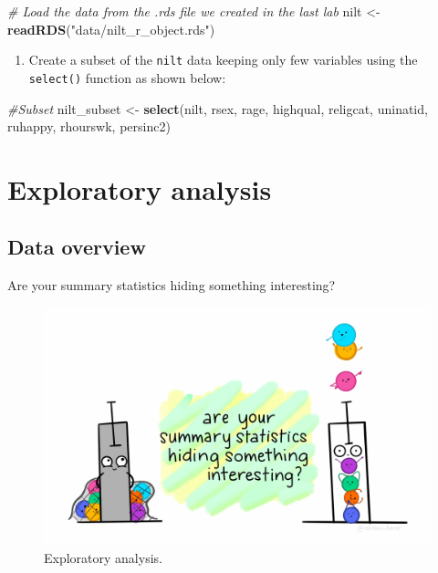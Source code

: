 \documentclass[
]{book}
\newenvironment{Shaded}{\begin{snugshade}}{\end{snugshade}}
\newcommand{\CommentTok}[1]{\textcolor[rgb]{0.56,0.35,0.01}{\textit{#1}}}
\newcommand{\FunctionTok}[1]{\textcolor[rgb]{0.13,0.29,0.53}{\textbf{#1}}}
\newcommand{\NormalTok}[1]{#1}
\newcommand{\OtherTok}[1]{\textcolor[rgb]{0.56,0.35,0.01}{#1}}
\newcommand{\StringTok}[1]{\textcolor[rgb]{0.31,0.60,0.02}{#1}}
\providecommand{\tightlist}{%
  \setlength{\itemsep}{0pt}\setlength{\parskip}{0pt}}
\begin{document}
\begin{Shaded}
\begin{Highlighting}[]
\CommentTok{\# Load the data from the .rds file we created in the last lab}
\NormalTok{nilt }\OtherTok{\textless{}{-}} \FunctionTok{readRDS}\NormalTok{(}\StringTok{"data/nilt\_r\_object.rds"}\NormalTok{)}
\end{Highlighting}
\end{Shaded}

\begin{enumerate}
\def\labelenumi{\arabic{enumi}.}
\setcounter{enumi}{4}
\tightlist
\item
  Create a subset of the \texttt{nilt} data keeping only few variables using the \texttt{select()} function as shown below:
\end{enumerate}

\begin{Shaded}
\begin{Highlighting}[]
\CommentTok{\#Subset}
\NormalTok{nilt\_subset }\OtherTok{\textless{}{-}} \FunctionTok{select}\NormalTok{(nilt, rsex, rage, highqual, religcat, uninatid,  ruhappy, rhourswk, persinc2)}
\end{Highlighting}
\end{Shaded}

\hypertarget{exploratory-analysis}{%
\section{Exploratory analysis}\label{exploratory-analysis}}

\hypertarget{data-overview}{%
\subsection{Data overview}\label{data-overview}}

Are your summary statistics hiding something interesting?

\begin{figure}

\includegraphics[width=1\linewidth]{./images/lab_3_summary_stats} \hfill{}

\caption{Exploratory analysis.}\label{fig:unnamed-chunk-47}
\end{figure}
\end{document}
